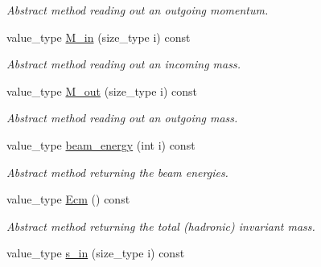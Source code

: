 \begin{DoxyCompactItemize}
\begin{DoxyCompactList}\small\item\em Abstract method reading out an outgoing momentum. \end{DoxyCompactList}\item 
\hypertarget{a00454_acebe86b76743a3feef3a20adf450582c}{}value\+\_\+type \hyperlink{a00454_acebe86b76743a3feef3a20adf450582c}{M\+\_\+in} (size\+\_\+type i) const \label{a00454_acebe86b76743a3feef3a20adf450582c}

\begin{DoxyCompactList}\small\item\em Abstract method reading out an incoming mass. \end{DoxyCompactList}\item 
\hypertarget{a00454_a7539c158e77e9195f55a6e50ee54affb}{}value\+\_\+type \hyperlink{a00454_a7539c158e77e9195f55a6e50ee54affb}{M\+\_\+out} (size\+\_\+type i) const \label{a00454_a7539c158e77e9195f55a6e50ee54affb}

\begin{DoxyCompactList}\small\item\em Abstract method reading out an outgoing mass. \end{DoxyCompactList}\item 
\hypertarget{a00454_a1dc3a6e29880a81f5ea7e25f9030a88d}{}value\+\_\+type \hyperlink{a00454_a1dc3a6e29880a81f5ea7e25f9030a88d}{beam\+\_\+energy} (int i) const \label{a00454_a1dc3a6e29880a81f5ea7e25f9030a88d}

\begin{DoxyCompactList}\small\item\em Abstract method returning the beam energies. \end{DoxyCompactList}\item 
\hypertarget{a00454_ac3b9dc4b12faf73ae5e405d1abff79e1}{}value\+\_\+type \hyperlink{a00454_ac3b9dc4b12faf73ae5e405d1abff79e1}{Ecm} () const \label{a00454_ac3b9dc4b12faf73ae5e405d1abff79e1}

\begin{DoxyCompactList}\small\item\em Abstract method returning the total (hadronic) invariant mass. \end{DoxyCompactList}\item 
\hypertarget{a00454_adea6cd552284eb156717a0a426179731}{}value\+\_\+type \hyperlink{a00454_adea6cd552284eb156717a0a426179731}{s\+\_\+in} (size\+\_\+type i) const \label{a00454_adea6cd552284eb156717a0a426179731}


\end{DoxyCompactItemize}
